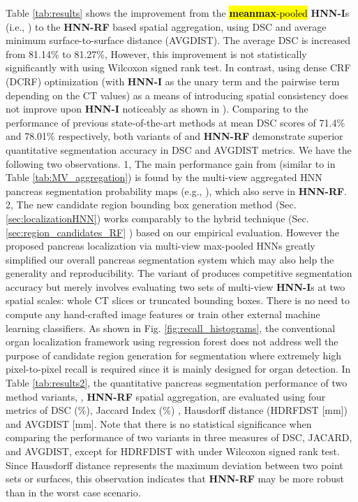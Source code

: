 \documentclass[journal]{IEEEtran}
\begin{document}
Table \ref{tab:results} shows the improvement from the \hl{\textbf{meanmax}-pooled} \textbf{HNN-I}s (i.e., ) to the \textbf{HNN-RF} based spatial aggregation, using DSC and average minimum surface-to-surface distance (AVGDIST). The average DSC is increased from 81.14\% to 81.27\%, However, this improvement is not statistically significantly with  using Wilcoxon signed rank test. In contrast, using dense CRF (DCRF) optimization \cite{chen2014semantic} (with \textbf{HNN-I} as the unary term and the pairwise term depending on the CT values) as a means of introducing spatial consistency does not improve upon \textbf{HNN-I} noticeably as shown in \cite{roth2016spatial}). Comparing to the performance of previous state-of-the-art methods \cite{roth2015deeporgan, roth2016spatial} at mean DSC scores of 71.4\% and 78.01\% respectively, both variants of  and \textbf{HNN-RF} demonstrate superior quantitative segmentation accuracy in DSC and AVGDIST metrics. We have the following two observations. 1, The main performance gain from \cite{roth2016spatial} (similar to  in Table \ref{tab:MV_aggregation}) is found by the multi-view aggregated HNN pancreas segmentation probability maps (e.g., ), which also serve in \textbf{HNN-RF}. 2, The new candidate region bounding box generation method (Sec. \ref{sec:localizationHNN}) works comparably to the hybrid technique (Sec. \ref{sec:region_candidates_RF} \cite{farag2014bottom,roth2015deeporgan,roth2016spatial}) based on our empirical evaluation. However the proposed pancreas localization via multi-view max-pooled HNNs greatly simplified our overall pancreas segmentation system which may also help the generality and reproducibility. The variant of  produces competitive segmentation accuracy but merely involves evaluating two sets of multi-view \textbf{HNN-I}s at two spatial scales: whole CT slices or truncated bounding boxes. There is no need to compute any hand-crafted image features \cite{farag2014bottom} or train other external machine learning classifiers. As shown in Fig. \ref{fig:recall_histograms}, the conventional organ localization framework using regression forest \cite{criminisi2013regression,laybirkbeck2013} does not address well the purpose of candidate region generation for segmentation where extremely high pixel-to-pixel recall is required since it is mainly designed for organ detection.
In Table \ref{tab:results2}, the quantitative pancreas segmentation performance of two method variants, , \textbf{HNN-RF} spatial aggregation, are evaluated using four metrics of DSC (\%), Jaccard Index (\%) \cite{Levandowsky1971}, Hausdorff distance (HDRFDST [mm]) \cite{Rockafellar2005} and AVGDIST [mm]. Note that there is no statistical significance when comparing the performance of two variants in three measures of DSC, JACARD, and AVGDIST, except for HDRFDIST with  under Wilcoxon signed rank test. Since Hausdorff distance represents the maximum deviation between two point sets or surfaces, this observation indicates that \textbf{HNN-RF} may be more robust than  in the worst case scenario.
\end{document}
